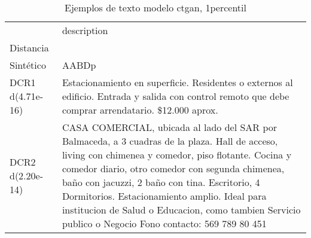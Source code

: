 \begin{table}[H]
\centering
\fontsize{10}{14}\selectfont
\caption{Ejemplos de texto modelo ctgan, 1percentil}
\label{table-example-economicos-b-2-ctgan-1p-text}
\begin{tabular}{|l|m{35em}|}
\hline
\rowcolor[gray]{0.8}
 & description \\
Distancia &  \\
\hline Sintético & AABDp \\
\hline DCR1 d(4.71e-16) & Estacionamiento en superficie. Residentes o externos al edificio. Entrada y salida con control remoto que debe comprar arrendatario. \$12.000 aprox. \\
\hline DCR2 d(2.20e-14) &  CASA COMERCIAL, ubicada  al lado del SAR por Balmaceda, a 3 cuadras de la plaza. Hall de acceso, living con chimenea y comedor, piso flotante. Cocina y comedor diario, otro comedor con segunda chimenea, ba\~no con jacuzzi, 2 ba\~no con tina. Escritorio, 4 Dormitorios. Estacionamiento amplio. 
Ideal para institucion de Salud o Educacion, como tambien Servicio publico o Negocio 
Fono contacto: 569 789 80 451 \\
\hline
\end{tabular}
\end{table}
